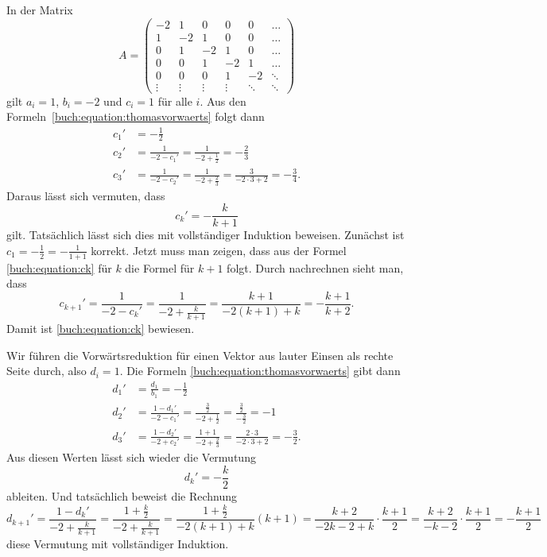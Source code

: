 \begin{beispiel}
In der Matrix
\begin{equation}
A=\begin{pmatrix}
    -2&     1&     0&     0&     0&\dots \\
     1&    -2&     1&     0&     0&\dots \\
     0&     1&    -2&     1&     0&\dots \\
     0&     0&     1&    -2&     1&\dots \\
     0&     0&     0&     1&    -2&\ddots\\
\vdots&\vdots&\vdots&\vdots&\ddots&\ddots
\end{pmatrix}
\label{buch:equation:Atridiagonal}
\end{equation}
gilt $a_i=1$, $b_i=-2$ und $c_i=1$ für alle $i$.
Aus den Formeln~\eqref{buch:equation:thomasvorwaerts}
folgt dann
\begin{align*}
c_1'&=-\frac12
\\
c_2'&=\frac{1}{-2-c_1'}=\frac{1}{-2+\frac12}=-\frac{2}{3}
\\
c_3'&=\frac{1}{-2-c_2'}=\frac{1}{-2+\frac{2}{3}}=\frac{3}{-2\cdot 3 + 2}
=-\frac{3}{4}.
\end{align*}
Daraus lässt sich vermuten, dass
\begin{equation}
c_k'=-\frac{k}{k+1}
\label{buch:equation:ck}
\end{equation}
gilt.
Tatsächlich lässt sich dies mit vollständiger Induktion beweisen.
%
Zunächst ist $c_1=-\frac12=-\frac1{1+1}$ korrekt.
Jetzt muss man zeigen, dass aus der Formel \eqref{buch:equation:ck} für $k$
die Formel für $k+1$ folgt.
Durch nachrechnen sieht man, dass
\[
c_{k+1}'
=
\frac1{-2-c_{k}'}
=
\frac{1}{-2+\displaystyle\frac{k}{k+1}}
=
\frac{k+1}{-2(k+1)+k}
=
-\frac{k+1}{k+2}.
\]
Damit ist \eqref{buch:equation:ck} bewiesen.

Wir führen die Vorwärtsreduktion für einen Vektor aus lauter Einsen
als rechte Seite durch, also $d_i=1$.
%
Die Formeln \eqref{buch:equation:thomasvorwaerts} gibt dann
\begin{align*}
d_1'
&=
\frac{d_1}{b_1} = -\frac12
\\
d_2'
&=
\frac{1-d_1'}{-2-c_1'}
=
\frac{\frac32}{-2+\frac12}
=
\frac{\frac32}{-\frac{3}{2}}
=-1
\\
d_3'
&=
\frac{1-d_2'}{-2+c_2'}
=
\frac{1+1}{-2+\frac23}
=
\frac{2\cdot 3}{-2\cdot 3 + 2}
=
-\frac{3}{2}.
\end{align*}
Aus diesen Werten lässt sich wieder die Vermutung 
\[
d_{k}'=-\frac{k}2
\]
ableiten.
Und tatsächlich beweist die Rechnung
\[
d_{k+1}'
=
\frac{1-d_k'}{-2+\frac{k}{k+1}}
=
\frac{1+\frac{k}{2}}{-2+\frac{k}{k+1}}
=
\frac{1+\frac{k}{2}}{-2(k+1)+k} (k+1)
=
\frac{k+2}{-2k-2+k}
\cdot
\frac{k+1}{2}
=
\frac{k+2}{-k-2}
\cdot
\frac{k+1}{2}
=
-\frac{k+1}{2}
\]
diese Vermutung mit vollständiger Induktion.
\end{beispiel}

